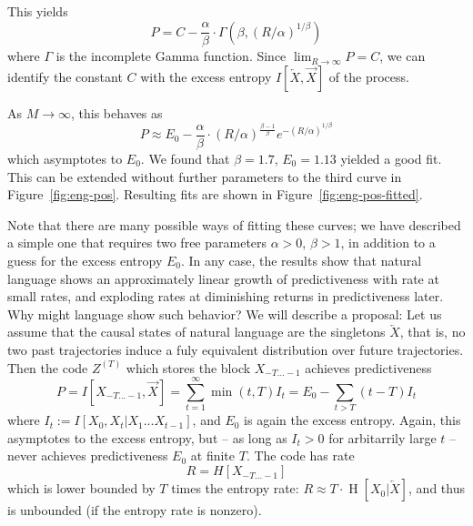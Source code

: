 \documentclass[11pt,letterpaper]{article}
\begin{document}
This yields
\begin{equation}
	P = C - \frac{\alpha}{\beta} \cdot \Gamma\left(\beta, (R/\alpha)^{1/\beta}\right)
\end{equation}
where $\Gamma$ is the incomplete Gamma function.
Since $\lim_{R \rightarrow \infty} P = C$, we can identify the constant $C$ with the excess entropy $I[\overleftarrow{X}, \overrightarrow{X}]$ of the process.

As $M \rightarrow \infty$, this behaves as
\begin{equation}
	P \approx E_0 - \frac{\alpha}{\beta} \cdot (R/\alpha)^{\frac{\beta-1}{\beta}} e^{-(R/\alpha)^{1/\beta}}
\end{equation}
which asymptotes to $E_0$.
We found that $\beta = 1.7$, $E_0 = 1.13$ yielded a good fit.
This can be extended without further parameters to the third curve in Figure~\ref{fig:eng-pos}.
Resulting fits are shown in Figure~\ref{fig:eng-pos-fitted}.

Note that there are many possible ways of fitting these curves; we have described a simple one that requires two free parameters $\alpha >0$, $\beta > 1$, in addition to a guess for the excess entropy $E_0$.
In any case, the results show that natural language shows an approximately linear growth of predictiveness with rate at small rates, and exploding rates at diminishing returns in predictiveness later.
Why might language show such behavior?
We will describe a proposal:
Let us assume that the causal states of natural language are the singletons $\overleftarrow{X}$, that is, no two past trajectories induce a fuly equivalent distribution over future trajectories.
Then the code $Z^{(T)}$ which stores the block $X_{-T...-1}$ achieves predictiveness
\begin{equation}
	P =	I[X_{-T...-1}, \overrightarrow{X}] = \sum_{t=1}^\infty \min(t,T) I_t = E_0 - \sum_{t > T} (t-T) I_t
\end{equation}
where $I_t := I[X_0, X_t | X_1 ... X_{t-1}]$, and $E_0$ is again the excess entropy.
Again, this asymptotes to the excess entropy, but -- as long as $I_t > 0$ for arbitarrily large $t$ -- never achieves predictiveness $E_0$ at finite $T$.
The code has rate
\begin{equation}
	R =	H[X_{-T...-1}]
\end{equation}
which is lower bounded by $T$ times the entropy rate: $R \approx T \cdot \operatorname{H}[X_0|\overleftarrow{X}]$, and thus is unbounded (if the entropy rate is nonzero).
\end{document}
